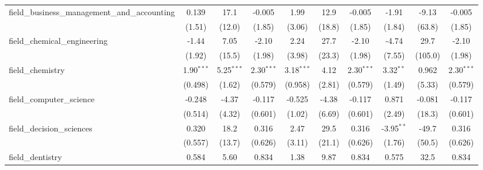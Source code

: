 \begin{tabular}{lccccccccc}
   field\_business\_management\_and\_accounting                & 0.139          & 17.1           & -0.005        & 1.99          & 12.9           & -0.005        & -1.91         & -9.13         & -0.005\\   
                                                               & (1.51)         & (12.0)         & (1.85)        & (3.06)        & (18.8)         & (1.85)        & (1.84)        & (63.8)        & (1.85)\\   
   field\_chemical\_engineering                                & -1.44          & 7.05           & -2.10         & 2.24          & 27.7           & -2.10         & -4.74         & 29.7          & -2.10\\   
                                                               & (1.92)         & (15.5)         & (1.98)        & (3.98)        & (23.3)         & (1.98)        & (7.55)        & (105.0)       & (1.98)\\   
   field\_chemistry                                            & 1.90$^{***}$   & 5.25$^{***}$   & 2.30$^{***}$  & 3.18$^{***}$  & 4.12           & 2.30$^{***}$  & 3.32$^{**}$   & 0.962         & 2.30$^{***}$\\   
                                                               & (0.498)        & (1.62)         & (0.579)       & (0.958)       & (2.81)         & (0.579)       & (1.49)        & (5.33)        & (0.579)\\   
   field\_computer\_science                                    & -0.248         & -4.37          & -0.117        & -0.525        & -4.38          & -0.117        & 0.871         & -0.081        & -0.117\\   
                                                               & (0.514)        & (4.32)         & (0.601)       & (1.02)        & (6.69)         & (0.601)       & (2.49)        & (18.3)        & (0.601)\\   
   field\_decision\_sciences                                   & 0.320          & 18.2           & 0.316         & 2.47          & 29.5           & 0.316         & -3.95$^{**}$  & -49.7         & 0.316\\   
                                                               & (0.557)        & (13.7)         & (0.626)       & (3.11)        & (21.1)         & (0.626)       & (1.76)        & (50.5)        & (0.626)\\   
   field\_dentistry                                            & 0.584          & 5.60           & 0.834         & 1.38          & 9.87           & 0.834         & 0.575         & 32.5          & 0.834\\   

\end{tabular}
